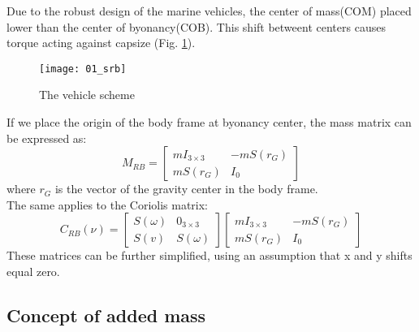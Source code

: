    Due to the robust design of the marine vehicles, the center of mass(COM) placed lower than the center of byonancy(COB).
    This shift betweent centers causes torque acting against capsize (Fig. \ref{image:scheme}).\\
    \begin{figure}[H]
        \centering\texttt{[image: 01\_srb]}
        \caption{The vehicle scheme}
        \label{image:scheme}
    \end{figure}
    If we place the origin of the body frame at byonancy center, the mass matrix can be expressed as:\\
    $$
    M_{R B}=\left[\begin{array}{cc}
        m I_{3 \times 3} & -m S\left(r_G\right) \\
        m S\left(r_G\right) & I_0
    \end{array}\right]
    $$
    where $r_G$ is the vector of the gravity center in the body frame.\\
    The same applies to the Coriolis matrix:
    $$
    C_{R B}(\nu) =\left[\begin{array}{cc}
        S(\omega) & 0_{3 \times 3} \\
        S(v) & S(\omega)
    \end{array}\right]\left[\begin{array}{cc}
        m I_{3 \times 3} & -m S\left(r_G\right) \\
        m S\left(r_G\right) & I_0
    \end{array}\right]
    $$
    These matrices can be further simplified, using an assumption that x and y shifts equal zero. 
\subsection{Concept of added mass}

